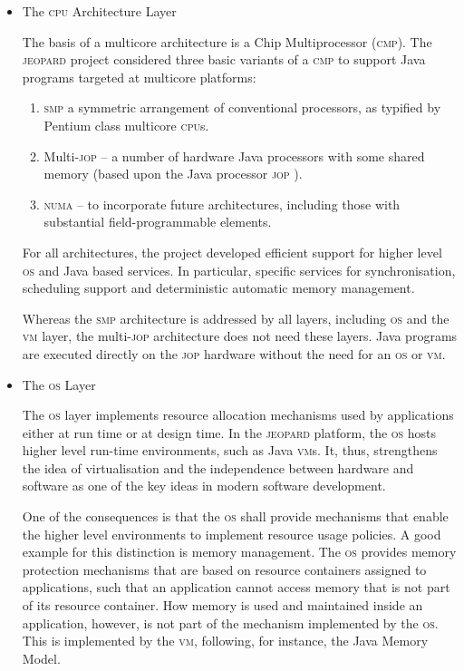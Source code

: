 \documentclass{sig-alternate}
\newcommand{\acronym}[1]{\textsc{#1}}
\begin{document}
\begin{itemize}
\item The \acronym{cpu} Architecture Layer

The basis of a multicore architecture is a Chip Multiprocessor
(\acronym{cmp}). The \acronym{jeopard} project considered three
basic variants of a \acronym{cmp} to support Java programs targeted
at multicore platforms:
\begin{enumerate}
\item \acronym{smp} a symmetric arrangement of conventional processors,
as typified by Pentium class multicore \acronym{cpu}s.

\item Multi-\acronym{jop} -- a number of hardware Java processors
with some shared memory (based upon the Java processor
\acronym{jop} \cite{pit, jop}).

\item \acronym{numa} -- to incorporate future architectures, including
those with substantial field-programmable elements.
\end{enumerate}

For all architectures, the project developed efficient support
for higher level \acronym{os} and Java based services. In particular,
specific services for synchronisation, sche\-du\-ling support
and deterministic automatic memory management. 

Whereas the \acronym{smp} architecture is addressed by 
all layers, including \acronym{os} and the \acronym{vm} layer, 
the multi-\acronym{jop} architecture does not need 
these layers. Java programs are executed 
directly on the \acronym{jop} hardware
without the need for an \acronym{os} or \acronym{vm}.

\item The \acronym{os} Layer

The \acronym{os} layer implements resource allocation mechanisms
used by applications either at run time or at design time.
In the \acronym{jeopard} platform, the \acronym{os} 
hosts higher level run-time environments, such as Java \acronym{vm}s. 
It, thus, strengthens the idea of virtualisation
and the independence between hardware and software 
as one of the key ideas in modern software development.

One of the consequences is that the \acronym{os} shall 
provide mechanisms that enable the higher level environments 
to implement resource usage policies.
A good example for this distinction is memory management.
The \acronym{os} provides memory protection mechanisms
that are based on resource containers assigned to applications,
such that an application cannot access memory 
that is not part of its resource container.
How memory is used and maintained inside an application, however,
is not part of the mechanism implemented by the \acronym{os}.
This is implemented by the \acronym{vm}, 
following, for instance, the Java Memory Model.


\end{itemize}
\end{document}
